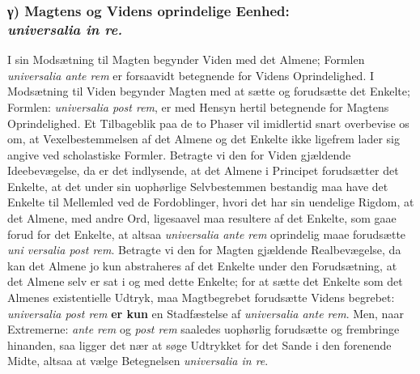 \documentclass[11pt]{book}
\newcommand{\opage}[1]{\marginnote{\footnotesize\textit{[#1]}}}
\begin{document}
\subsubsection*{γ) Magtens og Videns oprindelige Eenhed:\\
\textit{universalia in re.}}

I sin Modsætning til Magten begynder Viden med det Almene; Formlen
\textit{universalia ante rem} er forsaavidt betegnende for Videns
Oprindelighed. I Modsætning til Viden begynder Magten med at sætte og
forudsætte det Enkelte; Formlen: \textit{universalia post rem}, er med
Hensyn hertil betegnende for Magtens Oprindelighed. Et Tilbageblik paa
de to Phaser vil imidlertid snart overbevise os om, at
Vexelbestemmelsen af det Almene og det Enkelte ikke ligefrem lader sig
angive ved scholastiske Formler. Betragte vi den for Viden gjældende
Ideebevægelse, da er det indlysende, at det Almene i Principet
forudsætter det Enkelte, at det under sin uophørlige Selvbestemmen
bestandig maa have det Enkelte til Mellemled ved de Fordoblinger, hvori
det har sin uendelige Rigdom, at det Almene, med andre Ord, ligesaavel
maa resultere af det Enkelte, som gaae forud for det Enkelte, at altsaa
\textit{universalia ante rem} oprindelig maae forudsætte \textit{uni\-%
versalia post rem}. Betragte vi den for Magten gjældende
Realbevægelse, da kan det Almene jo kun abstraheres af det Enkelte
under den Forudsætning, at det Almene selv er sat i og med dette
Enkelte; for at sætte det Enkelte som det Almenes existentielle Udtryk,
maa Magtbegrebet forudsætte Videns\-%
\opage{208} \setcounter{footnote}{0}%
begrebet: \textit{universalia post rem} \textbf{er kun} en Stadfæstelse
af \textit{universalia ante rem}. Men, naar Extremerne: \textit{ante
rem} og \textit{post rem} saaledes uophørlig forudsætte og frembringe
hinanden, saa ligger det nær at søge Udtrykket for det Sande i den
forenende Midte, altsaa at vælge Betegnelsen \textit{universalia in
re}.
\end{document}

